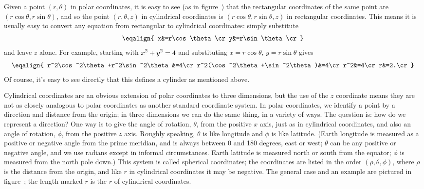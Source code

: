 Given a point $(r,\theta)$ in polar coordinates, it is easy 
to see  (as in figure~) that
the rectangular coordinates of the same point are
$(r\cos\theta,r\sin\theta)$, and so the point $(r,\theta,z)$ in
cylindrical coordinates is $(r\cos\theta,r\sin\theta,z)$ in
rectangular coordinates. This means it is usually easy to convert any
equation from rectangular to cylindrical coordinates: simply substitute
$$\eqalign{
  x&=r\cos\theta\cr
  y&=r\sin\theta\cr}
$$
and leave $z$ alone.
For example,
starting with $\displaystyle x^2+y^2=4$ and substituting $x=r\cos\theta$,
$y=r\sin\theta$ gives 
$$\eqalign{
  r^2\cos^2\theta+r^2\sin^2\theta&=4\cr
  r^2(\cos^2\theta+\sin^2\theta)&=4\cr
  r^2&=4\cr
  r&=2.\cr
}$$
Of course, it's easy to see directly that this defines a cylinder as
mentioned above.

Cylindrical coordinates are an obvious extension of polar coordinates
to three dimensions, but the use of the $z$ coordinate means they are
not as closely analogous to polar coordinates as another standard
coordinate system. In polar coordinates, we identify a point by a
direction and distance from the origin; in three dimensions we can do
the same thing, in a variety of ways. The question is: how do we
represent a direction? One way is to give the angle of rotation,
$\theta$, from the positive $x$ axis, just as in cylindrical
coordinates, and also an angle of rotation, $\phi$, from the positive
$z$ axis. Roughly speaking, $\theta$ is like longitude and $\phi$ is
like latitude. (Earth longitude is measured as a positive or negative
angle from the prime meridian, and is always between 0 and 180
degrees, east or west; $\theta$ can be any positive or negative angle,
and we use radians except in informal circumstances. 
Earth latitude is measured north or south
from the equator; $\phi$ is measured from the north pole down.) This
system is called {\dfont spherical coordinates\/}; 
the coordinates are listed in the order
$(\rho,\theta,\phi)$, where $\rho$ is the distance from the
origin, and like $r$ in cylindrical coordinates it may be negative. 
The general case and an
example are pictured in figure~; the
length marked $r$ is the $r$ of cylindrical coordinates.

